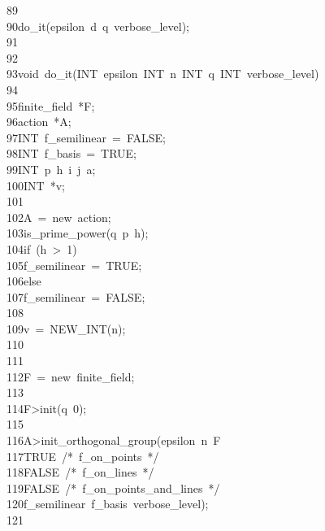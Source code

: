 \begin{tabbing}
89\>\>\>\>\\[0pt]
90\>\>do\_it(epsilon\ d\ q\ verbose\_level);\\[0pt]
91\>\\[0pt]
92\>\\[0pt]
93\>void\ do\_it(INT\ epsilon\ INT\ n\ INT\ q\ INT\ verbose\_level)\\[0pt]
94\>\\[0pt]
95\>\>finite\_field\ *F;\\[0pt]
96\>\>action\ *A;\\[0pt]
97\>\>INT\ f\_semilinear\ =\ FALSE;\\[0pt]
98\>\>INT\ f\_basis\ =\ TRUE;\\[0pt]
99\>\>INT\ p\ h\ i\ j\ a;\\[0pt]
100\>\>INT\ *v;\\[0pt]
101\>\>\\[0pt]
102\>\>A\ =\ new\ action;\\[0pt]
103\>\>is\_prime\_power(q\ p\ h);\\[0pt]
104\>\>if\ (h\ >\ 1)\\[0pt]
105\>\>\>f\_semilinear\ =\ TRUE;\\[0pt]
106\>\>else\\[0pt]
107\>\>\>f\_semilinear\ =\ FALSE;\\[0pt]
108\>\>\\[0pt]
109\>\>v\ =\ NEW\_INT(n);\\[0pt]
110\>\\[0pt]
111\>\>\\[0pt]
112\>\>F\ =\ new\ finite\_field;\\[0pt]
113\>\\[0pt]
114\>\>F>init(q\ 0);\\[0pt]
115\>\\[0pt]
116\>\>A>init\_orthogonal\_group(epsilon\ n\ F\ \\[0pt]
117\>\>\>TRUE\ /*\ f\_on\_points\ */\ \\[0pt]
118\>\>\>FALSE\ /*\ f\_on\_lines\ */\ \\[0pt]
119\>\>\>FALSE\ /*\ f\_on\_points\_and\_lines\ */\ \\[0pt]
120\>\>\>f\_semilinear\ f\_basis\ verbose\_level);\\[0pt]
121\>\>\\[0pt]

\end{tabbing}
